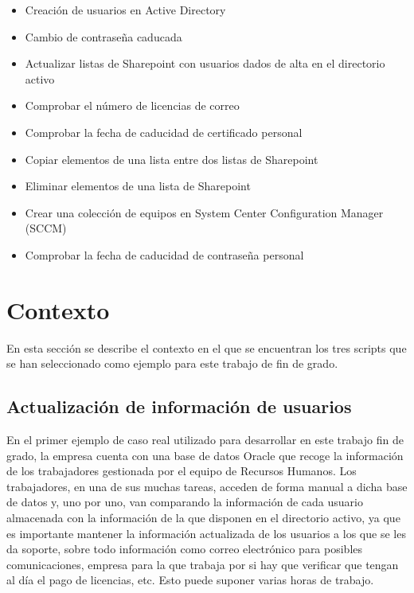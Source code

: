 \documentclass[a4paper, 12pt]{book}
\begin{document}
\begin{itemize}
\item Creación de usuarios en Active Directory

\item Cambio de contraseña caducada

\item Actualizar listas de Sharepoint con usuarios dados de alta en el directorio activo

\item Comprobar el número de licencias de correo

\item Comprobar la fecha de caducidad de certificado personal

\item Copiar elementos de una lista entre dos listas de Sharepoint

\item Eliminar elementos de una lista de Sharepoint

\item Crear una colección de equipos en System Center Configuration Manager (SCCM)

\item Comprobar la fecha de caducidad de contraseña personal
\end{itemize}


\section{Contexto}
\label{sec:contexto}

En esta sección se describe el contexto en el que se encuentran los tres scripts que se han seleccionado como ejemplo para este trabajo de fin de grado.

\subsection{Actualización de información de usuarios}
\label{subsec:Actualización de información de usuarios}

En el primer ejemplo de caso real utilizado para desarrollar en este trabajo fin de grado, la empresa cuenta con una base de datos Oracle que recoge la información de los trabajadores gestionada por el equipo de Recursos Humanos. Los trabajadores, en una de sus muchas tareas, acceden de forma manual a dicha base de datos y, uno por uno, van comparando la información de cada usuario almacenada con la información de la que disponen en el directorio activo, ya que es importante mantener la información actualizada de los usuarios a los que se les da soporte, sobre todo información como correo electrónico para posibles comunicaciones, empresa para la que trabaja por si hay que verificar que tengan al día el pago de licencias, etc. Esto puede suponer varias horas de trabajo.
\\
\end{document}
